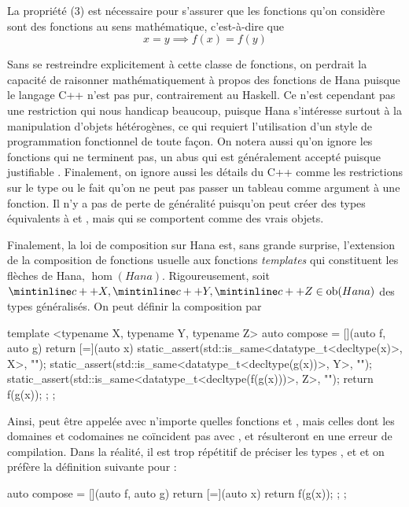 La propriété (3) est nécessaire pour s'assurer que les fonctions qu'on
considère sont des fonctions au sens mathématique, c'est-à-dire que
\[
    x = y \implies f(x) = f(y)
\]

Sans se restreindre explicitement à cette classe de fonctions, on perdrait la
capacité de raisonner mathématiquement à propos des fonctions de Hana puisque
le langage C++ n'est pas pur, contrairement au Haskell. Ce n'est cependant pas
une restriction qui nous handicap beaucoup, puisque Hana s'intéresse surtout à
la manipulation d'objets hétérogènes, ce qui requiert l'utilisation d'un style
de programmation fonctionnel de toute façon. On notera aussi qu'on ignore les
fonctions qui ne terminent pas, un abus qui est généralement accepté puisque
justifiable \cite{danielsson06}. Finalement, on ignore aussi les détails du
C++ comme les restrictions sur le type  ou le fait qu'on ne peut pas
passer un tableau comme argument à une fonction. Il n'y a pas de perte de
généralité puisqu'on peut créer des types équivalents à  et ,
mais qui se comportent comme des vrais objets.

Finalement, la loi de composition sur Hana est, sans grande surprise,
l'extension de la composition de fonctions usuelle aux fonctions
\textit{templates} qui constituent les flèches de Hana, $\hom(Hana)$.
Rigoureusement, soit $\icpp{X}, \icpp{Y}, \icpp{Z} \in \ob(Hana)$ des
types généralisés. On peut définir la composition par
\begin{cpp}
    template <typename X, typename Y, typename Z>
    auto compose = [](auto f, auto g) {
        return [=](auto x) {
            static_assert(std::is_same<datatype_t<decltype(x)>, X>{}, "");
            static_assert(std::is_same<datatype_t<decltype(g(x))>, Y>{}, "");
            static_assert(std::is_same<datatype_t<decltype(f(g(x)))>, Z>{}, "");
            return f(g(x));
        };
    };
\end{cpp}

Ainsi,  peut être appelée avec n'importe quelles fonctions
 et , mais celles dont les domaines et codomaines ne coïncident
pas avec ,  et  résulteront en une erreur de compilation.
Dans la réalité, il est trop répétitif de préciser les types , 
et  et on préfère la définition suivante pour :
\begin{cpp}
    auto compose = [](auto f, auto g) {
        return [=](auto x) {
            return f(g(x));
        };
    };
\end{cpp}

